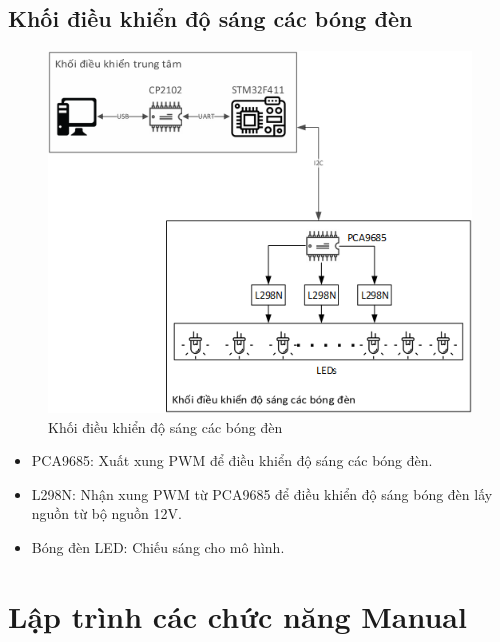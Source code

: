 \subsection{Khối điều khiển độ sáng các bóng đèn}
\begin{figure}[htp]
	\centering
	\includegraphics[scale=1]{Chapters/Chapter5/Images/KhoidieukhienLED.png}
	\caption{Khối điều khiển độ sáng các bóng đèn}
	\label{fig:C5KhoidieukhienLED}
\end{figure}
\begin{itemize}
\item PCA9685: Xuất xung PWM để điều khiển độ sáng các bóng đèn.
\item L298N: Nhận xung PWM từ PCA9685 để điều khiển độ sáng bóng đèn lấy nguồn từ bộ nguồn 12V.
\item Bóng đèn LED: Chiếu sáng cho mô hình.
\end{itemize}
\clearpage

\section{Lập trình các chức năng Manual}
